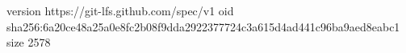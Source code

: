 version https://git-lfs.github.com/spec/v1
oid sha256:6a20ce48a25a0e8fc2b08f9dda2922377724c3a615d4ad441c96ba9aed8eabc1
size 2578
